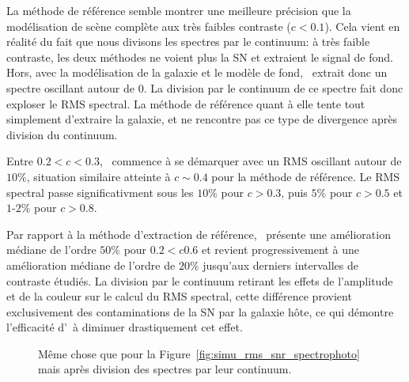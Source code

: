 \documentclass[../main/main.tex]{subfiles}
\begin{document}
La méthode de référence semble montrer une meilleure précision que la
modélisation de scène complète aux très faibles contraste
($c<0.1$). Cela vient en réalité du fait que nous divisons les spectres
par le continuum: à très faible contraste, les deux méthodes ne \og
voient\fg{} plus la SN et extraient le signal de fond. Hors, avec la
modélisation de la galaxie et le modèle de fond, \hypergal\ extrait donc
un spectre oscillant autour de $0$. La division par le continuum de ce
spectre fait donc exploser le RMS spectral. La méthode de référence
quant à elle tente tout simplement d'extraire la galaxie, et ne
rencontre pas ce type de divergence après division du continuum.

Entre $0.2<c<0.3$, \hypergal\ commence à se démarquer avec un RMS
oscillant autour de $10\%$, situation similaire atteinte à $c\sim0.4$
pour la méthode de référence. Le RMS spectral passe significativment sous
les $10\%$ pour $c>0.3$, puis $5\%$ pour $c>0.5$ et $1$-$2\%$ pour $c>0.8$.

Par rapport à la méthode d'extraction de référence, \hypergal\ présente une
amélioration médiane de l'ordre $50\%$ pour $0.2<c0.6$ et revient progressivement à une amélioration
médiane de l'ordre de $20\%$ jusqu'aux derniers intervalles de contraste
étudiés. La division par le continuum retirant les effets de l'amplitude
et de la couleur sur le calcul du RMS spectral, cette différence
provient exclusivement des contaminations de la SN par la galaxie hôte, ce qui
démontre l'efficacité d'\hypergal\ à diminuer drastiquement cet effet. 

\begin{figure}[ht]
  \centering
  \caption[Distribution du RMS spectral en fonction du SNR après
  correction du continuum.]{Même chose que pour la
    Figure~\ref{fig:simu_rms_snr_spectrophoto} mais après division des
    spectres par leur continuum.}
  \label{fig:simu_rms_snr_continuum_divided}
\end{figure}
\end{document}
